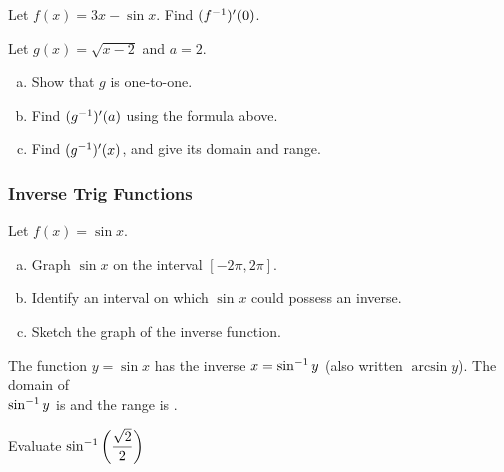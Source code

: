 \documentclass[notes]{subfiles}
\begin{document}
		\begin{pf}
		
		\end{pf}
			
		\begin{ex}
			Let \(f(x) = 3x - \sin x\).  Find \((f^{-1})'(0)\).
		\end{ex}
			\newpage
			
			
		\begin{ex}
			Let \(g(x) = \sqrt{x-2}\) and \(a = 2\).  
			\begin{enumerate}[(a)]
				\item Show that \(g\) is one-to-one.
					
				\item Find \((g^{-1})'(a)\) using the formula above.
					
				\item Find \((g^{-1})'(x)\), and give its domain and range.
			\end{enumerate}
		\end{ex}
			\newpage
			
	\subsubsection*{Inverse Trig Functions}
		\begin{ex}
			Let \(f(x) = \sin x\).
			\begin{enumerate}[(a)]
				\item Graph \(\sin x\) on the interval \([-2\pi,2\pi]\).
					\vs{1}
					
				\item Identify an interval on which \(\sin x\) could possess an inverse.
					\vs{.5}
				
				\item Sketch the graph of the inverse function.
					\vs{1}
			\end{enumerate}
		\end{ex}
		
		\begin{rmk}
			The function \(y = \sin x\) has the inverse \(x = \sin^{-1}y\) (also written \(\arcsin y\)).  The domain of \\[20pt] \(\sin^{-1}y\) is  and the range is \blank{2.5}.
		\end{rmk}
		\newpage
		
		\begin{ex}
			Evaluate \(\sin^{-1}\left( \dfrac{\sqrt{2}}{2}\right)\)
		\end{ex}
			
\end{document}
